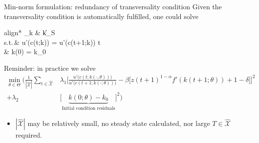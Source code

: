 \documentclass[aspectratio=169,10pt]{beamer}
\newcommand{\Xtrain}{\hat{\mathcal{X}}}
\newcommand{\st}{\textrm{s.t.}\,}
\begin{document}
\begin{frame}[label = ncg_seq]{Min-norm formulation: redundancy of transversality condition}
	Given the transversality condition is automatically fulfilled, one could solve 
	\begin{empheq}[box=\tcbhighmath]{align*}
		\min_{k \in {}} \quad & \|k\|_S\\
		\st \quad & u'(c(t;k)) = \beta u'(c(t+1;k))  \quad {} t \in \Xtrain \\
		\quad & k(0) = k_0
	\end{empheq}
	Reminder: in practice we solve
	\begin{align*}
		\min_{\theta \in \Theta}  \bigg(\frac{1}{|\Xtrain|}\sum_{t \in \Xtrain} & \lambda_1 \bigg[ \frac{u'\big(c(t;k(\cdot,\theta))\big)}{u'\big(c(t+1;k(\cdot;\theta))\big)} -\beta\big[z(t+1)^{1-\alpha} f'(k(t+1;\theta)) + 1-\delta\big]\bigg]^2 \\  + \lambda_2
		&  \bigg[\underbrace{k(0;\theta)-k_0}_{\text{Initial condition residuals}}\bigg]^2\bigg)
	\end{align*}
	\begin{itemize}
		\item $|\Xtrain|$ may be relatively small,  no steady state calculated, nor large $T \in \Xtrain$ required.
	\end{itemize}
\end{frame}
\end{document}
